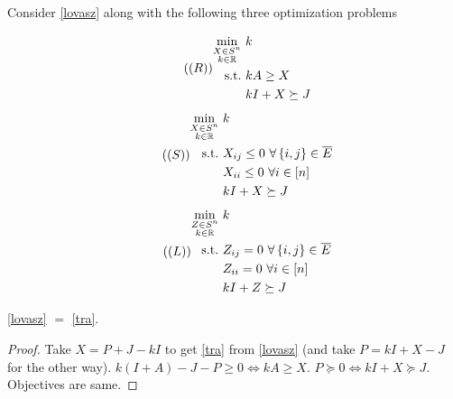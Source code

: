 \begin{enumerate}[leftmargin=*, label=(\alph*)]
Consider \ref{lovasz} along with the following three optimization problems
\begin{multicols}{3}
\begin{equation}\label{tra}\tag{$(R)$}
\begin{aligned}
\min_{\substack{X\in S^{n}\\k\in \mathbb{R}}}&~ k\\
\text{s.t.} &~ kA \ge X\\
&~ kI+X\succeq J
\end{aligned}
\end{equation}
\begin{equation}\label{rel}\tag{$(S)$}
\begin{aligned}
\min_{\substack{X\in S^{n}\\k\in\mathbb{R}}}&~ k\\
\text{s.t.} &~ X_{ij} \le 0 ~\forall \left\{i,j\right\}\in \overline E\\
&~X_{ii} \le 0 ~\forall i\in[n]\\
&~ kI+X\succeq J
\end{aligned}
\end{equation}
\begin{equation}\label{theta}\tag{$(L)$}
\begin{aligned}
\min_{\substack{Z\in S^{n}\\k\in\mathbb{R}}}&~ k\\
\text{s.t.} &~ Z_{ij} = 0 ~\forall \left\{i,j\right\}\in \overline E\\
&~Z_{ii} = 0 ~\forall i\in[n]\\
&~ kI+Z\succeq J
\end{aligned}
\end{equation}
\end{multicols}

\begin{cl}
\ref{lovasz} $=$ \ref{tra}.
\end{cl}
\begin{proof}
Take $X = P+J-kI$ to get \ref{tra} from \ref{lovasz} (and take $P=kI+X-J$ for the other way). $k(I+A)-J-P\ge 0\iff kA\ge X$. $P\succeq 0\iff kI+X\succeq J$. Objectives are same.
\end{proof}



\end{enumerate}
